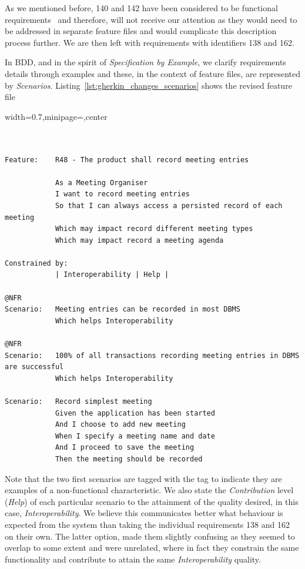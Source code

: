 \documentclass[dissertation,final]{softeng}
\newenvironment{featurecode}[1]
{ \lrbox\featurebox \begin{adjustbox}{width=#1\textwidth,minipage=\textwidth,center} }
{ \end{adjustbox}\endlrbox}
\newenvironment{featurelist}[2]
{
\newcommand{\setcaption}{\caption{#1}}
\newcommand{\setlabel}{\label{#2}}
}
{\begin{listing}[h!]\centering\usebox\featurebox\setcaption\setlabel\end{listing}}
\begin{document}
As we mentioned before, 140 and 142 have been considered to be functional requirements~\citep{MylopoulosOnt2014} and therefore, will not receive our attention as they would need to be addressed in separate feature files and would complicate this description process further. We are then left with requirements with identifiers 138 and 162.

In BDD, and in the spirit of \emph{Specification by Example}, we clarify requirements details through examples and these, in the context of feature files, are represented by \emph{Scenarios}. Listing~\ref{lst:gherkin_changes_scenarios} shows the revised feature file

\begin{featurelist}{Changes to Gherkin -- Scenarios}{lst:gherkin_changes_scenarios}
\begin{featurecode}{0.7}
\begin{verbatim}


Feature:    R48 - The product shall record meeting entries

            As a Meeting Organiser
            I want to record meeting entries
            So that I can always access a persisted record of each meeting
            Which may impact record different meeting types
            Which may impact record a meeting agenda
	
Constrained by:
            | Interoperability | Help |

@NFR
Scenario:   Meeting entries can be recorded in most DBMS
            Which helps Interoperability

@NFR	
Scenario:   100% of all transactions recording meeting entries in DBMS are successful
            Which helps Interoperability

Scenario:   Record simplest meeting
            Given the application has been started
            And I choose to add new meeting
            When I specify a meeting name and date
            And I proceed to save the meeting
            Then the meeting should be recorded
\end{verbatim}
\end{featurecode}
\end{featurelist}

Note that the two first scenarios are tagged with the tag \emph{\@NFR} to indicate they are examples of a non-functional characteristic. We also state the \emph{Contribution} level (\emph{Help}) of each particular scenario to the attainment of the quality desired, in this case, \emph{Interoperability}. We believe this communicates better what behaviour is expected from the system than taking the individual requirements 138 and 162 on their own. The latter option, made them slightly confusing as they seemed to overlap to some extent and were unrelated, where in fact they constrain the same functionality and contribute to attain the same \emph{Interoperability} quality.
\end{document}
